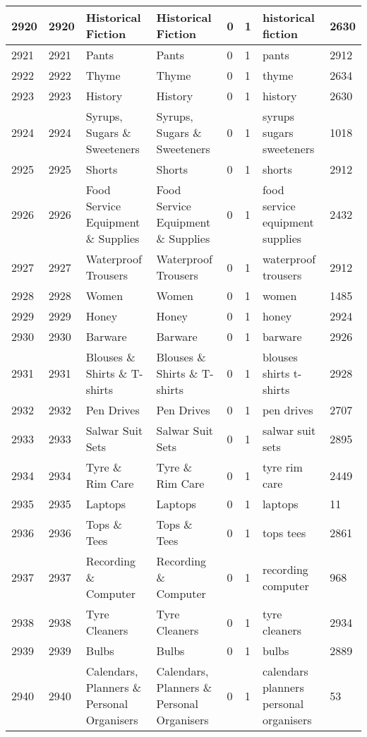 \begin{longtable}{|l|l|l|l|l|l|l|l|}
2920 & 2920 & Historical Fiction & Historical Fiction & 0 & 1 & historical fiction & 2630 \\ \hline 
2921 & 2921 & Pants & Pants & 0 & 1 & pants & 2912 \\ \hline 
2922 & 2922 & Thyme & Thyme & 0 & 1 & thyme & 2634 \\ \hline 
2923 & 2923 & History & History & 0 & 1 & history & 2630 \\ \hline 
2924 & 2924 & Syrups, Sugars \& Sweeteners & Syrups, Sugars \& Sweeteners & 0 & 1 & syrups sugars sweeteners & 1018 \\ \hline 
2925 & 2925 & Shorts & Shorts & 0 & 1 & shorts & 2912 \\ \hline 
2926 & 2926 & Food Service Equipment \& Supplies & Food Service Equipment \& Supplies & 0 & 1 & food service equipment supplies & 2432 \\ \hline 
2927 & 2927 & Waterproof Trousers & Waterproof Trousers & 0 & 1 & waterproof trousers & 2912 \\ \hline 
2928 & 2928 & Women & Women & 0 & 1 & women & 1485 \\ \hline 
2929 & 2929 & Honey & Honey & 0 & 1 & honey & 2924 \\ \hline 
2930 & 2930 & Barware & Barware & 0 & 1 & barware & 2926 \\ \hline 
2931 & 2931 & Blouses \& Shirts \& T-shirts & Blouses \& Shirts \& T-shirts & 0 & 1 & blouses shirts t-shirts & 2928 \\ \hline 
2932 & 2932 & Pen Drives & Pen Drives & 0 & 1 & pen drives & 2707 \\ \hline 
2933 & 2933 & Salwar Suit Sets & Salwar Suit Sets & 0 & 1 & salwar suit sets & 2895 \\ \hline 
2934 & 2934 & Tyre \& Rim Care & Tyre \& Rim Care & 0 & 1 & tyre rim care & 2449 \\ \hline 
2935 & 2935 & Laptops & Laptops & 0 & 1 & laptops & 11 \\ \hline 
2936 & 2936 & Tops \& Tees & Tops \& Tees & 0 & 1 & tops tees & 2861 \\ \hline 
2937 & 2937 & Recording \& Computer & Recording \& Computer & 0 & 1 & recording computer & 968 \\ \hline 
2938 & 2938 & Tyre Cleaners & Tyre Cleaners & 0 & 1 & tyre cleaners & 2934 \\ \hline 
2939 & 2939 & Bulbs & Bulbs & 0 & 1 & bulbs & 2889 \\ \hline 
2940 & 2940 & Calendars, Planners \& Personal Organisers & Calendars, Planners \& Personal Organisers & 0 & 1 & calendars planners personal organisers & 53 \\ \hline 

\end{longtable}
